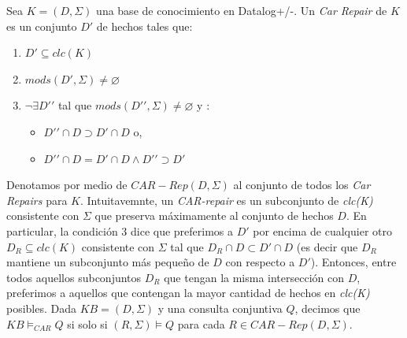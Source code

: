 \documentclass[11pt,a4paper,twoside]{tesis}
\begin{document}
Sea $K = (D, \Sigma)$ una base de conocimiento en Datalog+/-. Un \textit{Car Repair} de $K$ es un conjunto $D\prime$ de hechos tales que:
    \begin{enumerate}
        \item $D\prime \subseteq clc(K)$
        \item $mods(D\prime, \Sigma) \neq \varnothing$
        \item $\neg\exists D\prime\prime$ tal que $mods(D\prime\prime, \Sigma) \neq \varnothing$ y :
        \begin{itemize}
            \item $D\prime\prime \cap D \supset D\prime \cap D$ o,
            \item $D\prime\prime \cap D = D\prime \cap D \land D\prime\prime \supset D\prime$   
        \end{itemize}
    \end{enumerate}

Denotamos por medio de $CAR-Rep(D, \Sigma)$ al conjunto de todos los \textit{Car Repairs} para $K$.
Intuitavemnte, un \textit{CAR-repair} es un subconjunto de \textit{clc(K)} consistente con $\Sigma$ que preserva máximamente al conjunto de hechos $D$. En particular, la condición 3 dice que preferimos a $D\prime$ por encima de cualquier otro $D_R \subseteq clc(K)$ consistente con $\Sigma$ tal que $D_R \cap D \subset D\prime \cap D$ (es decir que $D_R$ mantiene un subconjunto más pequeño de $D$ con respecto a $D\prime$). Entonces, entre todos aquellos subconjuntos $D_R$ que tengan la misma intersección con $D$, preferimos a aquellos que contengan la mayor cantidad de hechos en \textit{clc(K)} posibles.
Dada $KB = (D, \Sigma)$ y una consulta conjuntiva $Q$, decimos que $KB \models_{CAR} Q$ si solo si $(R, \Sigma) \models Q$ para cada $R \in CAR-Rep(D, \Sigma)$.
\end{document}

